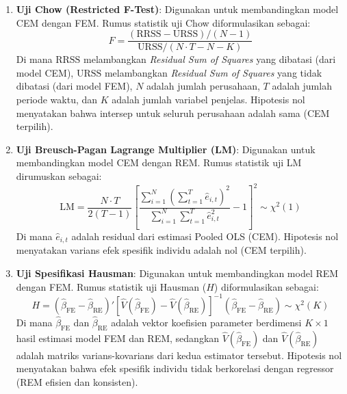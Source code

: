 \documentclass[12pt,a4paper]{article}
\begin{document}
\begin{enumerate}
\def\labelenumi{\arabic{enumi}.}
\item
  \textbf{Uji Chow (Restricted F-Test)}: Digunakan untuk membandingkan
  model CEM dengan FEM. Rumus statistik uji Chow diformulasikan sebagai:
  \begin{equation}
  F = \frac{(\mathrm{RRSS} - \mathrm{URSS}) / (N - 1)}{\mathrm{URSS} / (N \cdot T - N - K)}
  \end{equation} Di mana \(\mathrm{RRSS}\) melambangkan \emph{Residual
  Sum of Squares} yang dibatasi (dari model CEM), \(\mathrm{URSS}\)
  melambangkan \emph{Residual Sum of Squares} yang tidak dibatasi (dari
  model FEM), \(N\) adalah jumlah perusahaan, \(T\) adalah jumlah
  periode waktu, dan \(K\) adalah jumlah variabel penjelas. Hipotesis
  nol menyatakan bahwa intersep untuk seluruh perusahaan adalah sama
  (CEM terpilih).
\item
  \textbf{Uji Breusch-Pagan Lagrange Multiplier (LM)}: Digunakan untuk
  membandingkan model CEM dengan REM. Rumus statistik uji LM dirumuskan
  sebagai: \begin{equation}
  \mathrm{LM} = \frac{N \cdot T}{2(T - 1)} \left[ \frac{\sum_{i=1}^N \left( \sum_{t=1}^T \hat{e}_{i,t} \right)^2}{\sum_{i=1}^N \sum_{t=1}^T \hat{e}_{i,t}^2} - 1 \right]^2 \sim \chi^2(1)
  \end{equation} Di mana \(\hat{e}_{i,t}\) adalah residual dari estimasi
  Pooled OLS (CEM). Hipotesis nol menyatakan varians efek spesifik
  individu adalah nol (CEM terpilih).
\item
  \textbf{Uji Spesifikasi Hausman}: Digunakan untuk membandingkan model
  REM dengan FEM. Rumus statistik uji Hausman (\(H\)) diformulasikan
  sebagai: \begin{equation}
  H = (\hat{\beta}_{\mathrm{FE}} - \hat{\beta}_{\mathrm{RE}})' \left[ \hat{V}(\hat{\beta}_{\mathrm{FE}}) - \hat{V}(\hat{\beta}_{\mathrm{RE}}) \right]^{-1} (\hat{\beta}_{\mathrm{FE}} - \hat{\beta}_{\mathrm{RE}}) \sim \chi^2(K)
  \end{equation} Di mana \(\hat{\beta}_{\mathrm{FE}}\) dan
  \(\hat{\beta}_{\mathrm{RE}}\) adalah vektor koefisien parameter
  berdimensi \(K \times 1\) hasil estimasi model FEM dan REM, sedangkan
  \(\hat{V}(\hat{\beta}_{\mathrm{FE}})\) dan
  \(\hat{V}(\hat{\beta}_{\mathrm{RE}})\) adalah matriks
  varians-kovarians dari kedua estimator tersebut. Hipotesis nol
  menyatakan bahwa efek spesifik individu tidak berkorelasi dengan
  regressor (REM efisien dan konsisten).
\end{enumerate}
\end{document}

